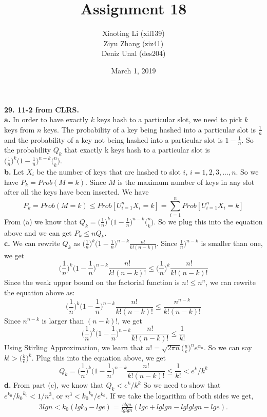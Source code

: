 \documentclass{article}
\title{Assignment 18}
\author{Xiaoting Li (xil139) \\
Ziyu Zhang (ziz41) \\
Deniz Unal (des204)}
\date{March 1, 2019}
\begin{document}
\maketitle

\noindent
\textbf{29. 11-2 from CLRS.}\\ \newline
\textbf{a.} In order to have exactly $k$ keys hash to a particular slot, we need to pick $k$ keys from $n$ keys. The probability of a key being hashed into a particular slot is $\frac{1}{n}$ and the probability of a key not being hashed into a particular slot is $1 - \frac{1}{n}$. So the probability $Q_k$ that exactly k keys hash to a particular slot is $\big(\frac{1}{n})^k\big(1 - \frac{1}{n})^{n-k}\big(_k^n)$. \\ \newline 
\textbf{b.} Let $X_i$ be the number of keys that are hashed to slot $i$, $i = 1, 2, 3, ..., n$. So we have $P_k = Prob(M = k)$. Since $M$ is the maximum number of keys in any slot after all the keys have been inserted. We have $$P_k = Prob(M = k) \leq Prob[U_{i=1}^{n}X_i = k] = \sum_{i=1}^{n}Prob[U_{i=1}^{n}X_i = k]$$
From (a) we know that $Q_k = \big(\frac{1}{n})^k\big(1 - \frac{1}{n})^{n-k}\big(_k^n)$. So we plug this into the equation above and we can get $P_k \leq nQ_k$. \\ \newline
\textbf{c.} We can rewrite $Q_k$ as $\big(\frac{1}{n})^k\big(1 - \frac{1}{n})^{n-k}\frac{n!}{k!(n-k)!}$. Since $\frac{1}{n})^{n-k}$ is smaller than one, we get $$\big(\frac{1}{n})^k\big(1 - \frac{1}{n})^{n-k}\frac{n!}{k!(n-k)!} \leq \big(\frac{1}{n})^k \frac{n!}{k!(n-k)!}$$
Since the weak upper bound on the factorial function is $n! \leq n^n$, we can rewrite the equation above as: $$\big(\frac{1}{n})^k\big(1 - \frac{1}{n})^{n-k}\frac{n!}{k!(n-k)!} \leq \frac{n^{n-k}}{k!(n - k)!}$$
Since $n^{n-k}$ is larger than $(n - k)!$, we get $$\big(\frac{1}{n})^k\big(1 - \frac{1}{n})^{n-k}\frac{n!}{k!(n-k)!} \leq \frac{1}{k!}$$
Using Stirling Approximation, we learn that $n! = \sqrt{2\pi n}\big(\frac{n}{e})^n e^{\alpha_n}$. So we can say $k! > \big(\frac{k}{e})^k$. Plug this into the equation above, we get 
$$Q_k = \big(\frac{1}{n})^k\big(1 - \frac{1}{n})^{n-k}\frac{n!}{k!(n-k)!} \leq \frac{1}{k!} < e^k/k^k$$
\textbf{d.} From part (c), we know that $Q_k < e^k/k^k$ So we need to show that $e^{k_0}/{k_0}^{k_0} < 1/n^3$, or $n^3 < {k_0}^{k_0}/e^{k_0}$. If we take the logarithm of both sides we get, 
\begin{align*}
3lgn < k_0(lgk_0 - lge) = \frac {clgn}{lglgn}(lgc + lglgn - lglglgn - lge).
\end{align*}
\end{document}
